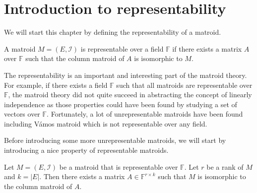 \section{Introduction to representability}

%

We will start this chapter by defining the representability of a matroid.

\begin{defn}
A matroid $M = (E, \mathcal{I})$ is representable over a field $\mathbb{F}$ if 
there exists a matrix $A$ over $\mathbb{F}$ such that the column matroid of $A$ is isomorphic to $M$.
\end{defn}

The representability is an important and interesting part of the matroid theory.
For example, if there exists a field $\mathbb{F}$ such that all matroids are representable over $\mathbb{F}$,
the matroid theory did not quite succeed in abstracting the concept of linearly independence
as those properties could have been found by studying a set of vectors over $\mathbb{F}$.
Fortunately, a lot of unrepresentable matroids have been found including V\'{a}mos matroid which is not representable over any field. \cite{matroidtheory}

Before introducing some more unrepresentable matroids, we will start by introducing a nice property of representable matroids.

\begin{thm}
Let $M = (E, \mathcal{I})$ be a matroid that is representable over $\mathbb{F}$.
Let $r$ be a rank of $M$ and $k = \lvert E \rvert$.
Then there exists a matrix $A \in \mathbb{F}^{r \times k}$ such that $M$ is isomorphic to the column matroid of $A$.
\end{thm}

